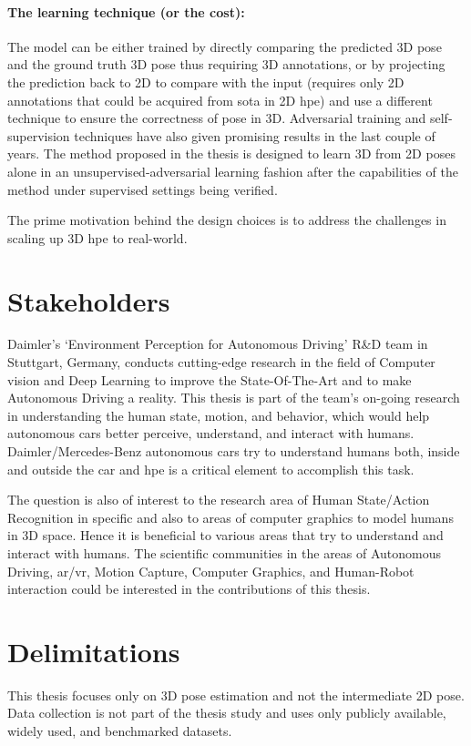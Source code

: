 \paragraph{The learning technique (or the cost):} The model can be either trained by directly comparing the predicted 3D pose and the ground truth 3D pose thus requiring 3D annotations, or by projecting the prediction back to 2D to compare with the input (requires only 2D annotations that could be acquired from \ac{sota} in 2D \ac{hpe}) and use a different technique to ensure the correctness of pose in 3D. Adversarial training and self-supervision techniques have also given promising results in the last couple of years. The method proposed in the thesis is designed to learn 3D from 2D poses alone in an unsupervised-adversarial learning fashion after the capabilities of the method under supervised settings being verified.

The prime motivation behind the design choices is to address the challenges in scaling up 3D \ac{hpe} to real-world.

\section{Stakeholders}
\label{sec:stakeholders}
Daimler’s ‘Environment Perception for Autonomous Driving’ R\&D team in Stuttgart, Germany, conducts cutting-edge research in the field of Computer vision and Deep Learning to improve the State-Of-The-Art and to make Autonomous Driving a reality. This thesis is part of the team’s on-going research in understanding the human state, motion, and behavior, which would help autonomous cars better perceive, understand, and interact with humans. Daimler/Mercedes-Benz autonomous cars try to understand humans both, inside and outside the car and \ac{hpe} is a critical element to accomplish this task.

The question is also of interest to the research area of Human State/Action Recognition in specific and also to areas of computer graphics to model humans in 3D space. Hence it is beneficial to various areas that try to understand and interact with humans. The scientific communities in the areas of Autonomous Driving, \ac{ar/vr}, Motion Capture, Computer Graphics, and Human-Robot interaction could be interested in the contributions of this thesis.

\section{Delimitations}
\label{sec:delimitations}
This thesis focuses only on 3D pose estimation and not the intermediate 2D pose. Data collection is not part of the thesis study and uses only publicly available, widely used, and benchmarked datasets.

